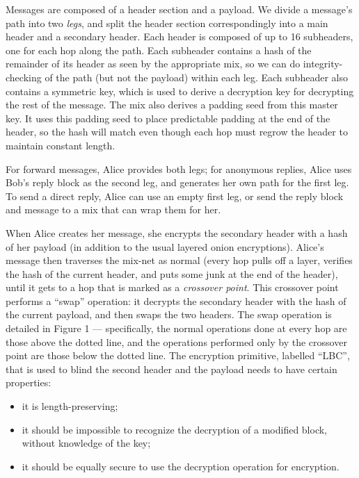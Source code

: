\documentclass[11pt]{IEEEtran}
\begin{document}
Messages are composed of a header section and a payload. We divide
a message's path into two \emph{legs}, and split the header section
correspondingly into a main header and a secondary header. Each header
is composed of up to 16 subheaders, one for each hop along the path.
Each subheader contains a hash of the remainder of its header as
seen by the appropriate mix, so we can do
integrity-checking of the path (but not the payload) within each leg.
Each subheader also contains a symmetric key, which is used to derive a
decryption key for decrypting the rest of the message. The mix also
derives a padding seed from this master key. It uses this padding seed
to place predictable padding at the end of the header, so the hash will
match even though each hop must regrow the header to maintain constant
length.

For forward messages, Alice provides both legs; for anonymous replies, Alice
uses Bob's reply block as the second leg, and generates her own path
for the first leg.  To send a direct reply, Alice can use an empty
first leg, or send the reply block and message to a mix that can wrap
them for her.

When Alice creates her message, she encrypts the secondary header
with a hash of her payload (in addition to the usual layered onion
encryptions). Alice's message then traverses the mix-net as normal (every
hop pulls off a layer, verifies the hash of the current header,
and puts some junk at the end of the header), until it gets to a
hop that is marked as a \emph{crossover point}. This crossover point
performs a ``swap'' operation: it decrypts the secondary header with
the hash of the current payload, and then swaps the two headers. The
swap operation is detailed in Figure 1 --- specifically, the normal
operations done at every hop are those above the dotted line, and the
operations performed only by the crossover point are those below
the dotted line. The encryption primitive, labelled ``LBC'', that is
used to blind the second header and the payload needs to have certain
properties:

\begin{itemize}
\item it is length-preserving;

\item it should be impossible to recognize the decryption of a modified
      block, without knowledge of the key;
\item it should be equally secure to use the decryption operation
      for encryption.
\end{itemize}
\end{document}
